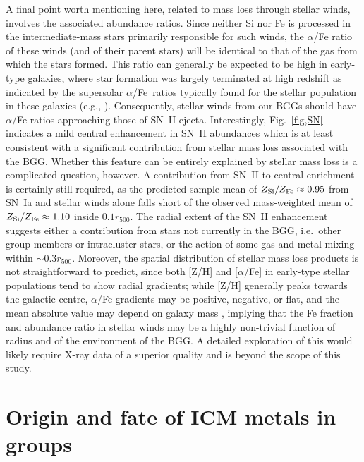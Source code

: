 \documentclass[useAMS,usenatbib]{mn2e}
\begin{document}
A final point worth mentioning here, related to mass loss through
stellar winds, involves the associated abundance ratios. Since neither
Si nor Fe is processed in the intermediate-mass stars primarily
responsible for such winds, the $\alpha$/Fe ratio of these winds (and
of their parent stars) will be identical to that of the gas from which
the stars formed. This ratio can generally be expected to be high in
early-type galaxies, where star formation was largely terminated at
high redshift as indicated by the supersolar $\alpha$/Fe~ratios
typically found for the stellar population in these galaxies (e.g.,
\citealt{sanc07}).  Consequently, stellar winds from our BGGs should
have $\alpha$/Fe ratios approaching those of SN~II ejecta.
Interestingly, Fig.~\ref{fig,SN} indicates a mild central enhancement
in SN~II abundances which is at least consistent with a significant
contribution from stellar mass loss associated with the BGG. Whether
this feature can be entirely explained by stellar mass loss is a
complicated question, however. A contribution from SN~II to central
enrichment is certainly still required, as the predicted sample mean
of $Z_{\rm Si}/Z_{\rm Fe} \approx 0.95$ from SN~Ia and stellar winds
alone falls short of the observed mass-weighted mean of $Z_{\rm
Si}/Z_{\rm Fe} \approx 1.10$ inside $0.1r_{500}$. The radial extent of
the SN~II enhancement suggests either a contribution from stars not
currently in the BGG, i.e.\ other group members or intracluster stars,
or the action of some gas and metal mixing within $\sim 0.3
r_{500}$. Moreover, the spatial distribution of stellar mass loss
products is not straightforward to predict, since both [Z/H] and
[$\alpha$/Fe] in early-type stellar populations tend to show radial
gradients; while [Z/H] generally peaks towards the galactic centre,
$\alpha$/Fe gradients may be positive, negative, or flat, and the mean
absolute value may depend on galaxy mass \citep{sanc07,spol09},
implying that the Fe fraction and abundance ratio in stellar winds may
be a highly non-trivial function of radius and of the environment of
the BGG. A detailed exploration of this would likely require X-ray
data of a superior quality and is beyond the scope of this study.




\section{Origin and fate of ICM metals in groups}\label{sec,fate}
\end{document}

